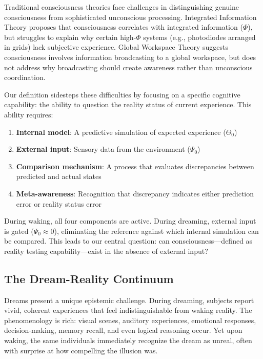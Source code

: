 \documentclass[11pt,a4paper]{article}
\begin{document}
Traditional consciousness theories face challenges in distinguishing genuine consciousness from sophisticated unconscious processing. Integrated Information Theory \cite{tononi2004ifi} proposes that consciousness correlates with integrated information ($\Phi$), but struggles to explain why certain high-$\Phi$ systems (e.g., photodiodes arranged in grids) lack subjective experience. Global Workspace Theory \cite{baars1988global} suggests consciousness involves information broadcasting to a global workspace, but does not address why broadcasting should create awareness rather than unconscious coordination.

Our definition sidesteps these difficulties by focusing on a specific cognitive capability: the ability to question the reality status of current experience. This ability requires:

\begin{enumerate}
\item \textbf{Internal model}: A predictive simulation of expected experience ($\Theta_0$)
\item \textbf{External input}: Sensory data from the environment ($\Psi_0$)
\item \textbf{Comparison mechanism}: A process that evaluates discrepancies between predicted and actual states
\item \textbf{Meta-awareness}: Recognition that discrepancy indicates either prediction error or reality status error
\end{enumerate}

During waking, all four components are active. During dreaming, external input is gated ($\Psi_0 \approx 0$), eliminating the reference against which internal simulation can be compared. This leads to our central question: can consciousness—defined as reality testing capability—exist in the absence of external input?

\subsection{The Dream-Reality Continuum}

Dreams present a unique epistemic challenge. During dreaming, subjects report vivid, coherent experiences that feel indistinguishable from waking reality. The phenomenology is rich: visual scenes, auditory experiences, emotional responses, decision-making, memory recall, and even logical reasoning occur. Yet upon waking, the same individuals immediately recognize the dream as unreal, often with surprise at how compelling the illusion was.
\end{document}
